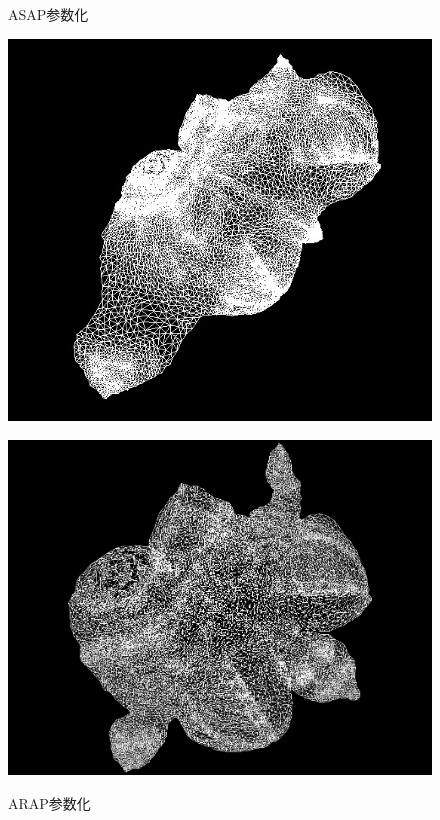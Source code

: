 \documentclass{article}
\begin{document}
\begin{figure}[htbp]
\begin{minipage}{0.24\linewidth}
			\label{chutian2}%
		\end{minipage}
		\begin{minipage}{0.24\linewidth}
			\centering
			\caption{ASAP参数化}
			\includegraphics[width=1\linewidth]{gargoyle_asap.JPG}
			\label{chutian2}%
		\end{minipage}
		\begin{minipage}{0.24\linewidth}
			\centering
			\caption{ARAP参数化}
			\includegraphics[width=1\linewidth]{gargoyle_arap.JPG}
			\label{chutian2}%
		\end{minipage}
	\end{figure}
\end{document}
